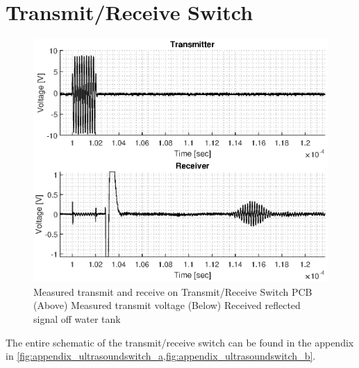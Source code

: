 \section{Transmit/Receive Switch}
\begin{figure}[htbp]
	\centering
	\includegraphics[width=.8\textwidth]{Figures/4_switch_pcb_meas.eps}
	\caption[Measured transmit and receive on Transmit/Receive Switch PCB]{Measured transmit and receive on Transmit/Receive Switch PCB (Above) Measured transmit voltage (Below) Received reflected signal off water tank}
	\label{fig:4_txrx_meas}
\end{figure}
The entire schematic of the transmit/receive switch can be found in the appendix in \cref{fig:appendix_ultrasoundswitch_a,fig:appendix_ultrasoundswitch_b}.
